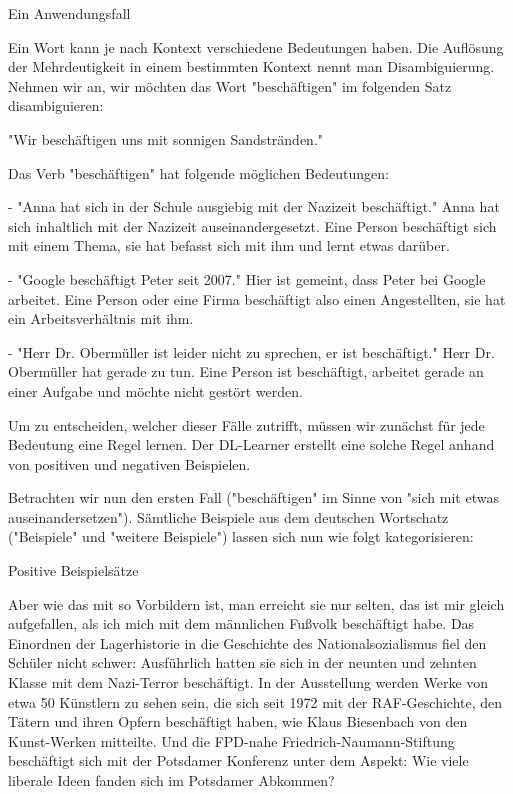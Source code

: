 Ein Anwendungsfall

Ein Wort kann je nach Kontext verschiedene Bedeutungen haben. Die Auflösung der Mehrdeutigkeit in einem bestimmten Kontext nennt man Disambiguierung.
Nehmen wir an, wir möchten das Wort "beschäftigen" im folgenden Satz disambiguieren:

"Wir beschäftigen uns mit sonnigen Sandstränden."

Das Verb "beschäftigen" hat folgende möglichen Bedeutungen:

- "Anna hat sich in der Schule ausgiebig mit der Nazizeit beschäftigt."
Anna hat sich inhaltlich mit der Nazizeit auseinandergesetzt. Eine Person beschäftigt sich mit einem Thema, sie hat befasst sich mit ihm und lernt etwas darüber.

- "Google beschäftigt Peter seit 2007."
Hier ist gemeint, dass Peter bei Google arbeitet. Eine Person oder eine Firma beschäftigt also einen Angestellten, sie hat ein Arbeitsverhältnis mit ihm.

- "Herr Dr. Obermüller ist leider nicht zu sprechen, er ist beschäftigt."
Herr Dr. Obermüller hat gerade zu tun. Eine Person ist beschäftigt, arbeitet gerade an einer Aufgabe und möchte nicht gestört werden.

Um zu entscheiden, welcher dieser Fälle zutrifft, müssen wir zunächst für jede Bedeutung eine Regel lernen.
Der DL-Learner erstellt eine solche Regel anhand von positiven und negativen Beispielen.

Betrachten wir nun den ersten Fall ("beschäftigen" im Sinne von "sich mit etwas auseinandersetzen").
Sämtliche Beispiele aus dem deutschen Wortschatz ("Beispiele" und "weitere Beispiele") lassen sich nun wie folgt kategorisieren:

Positive Beispielsätze

Aber wie das mit so Vorbildern ist, man erreicht sie nur selten, das ist mir gleich aufgefallen, als ich mich mit dem männlichen Fußvolk beschäftigt habe.
Das Einordnen der Lagerhistorie in die Geschichte des Nationalsozialismus fiel den Schüler nicht schwer: Ausführlich hatten sie sich in der neunten und zehnten Klasse mit dem Nazi-Terror beschäftigt.
In der Ausstellung werden Werke von etwa 50 Künstlern zu sehen sein, die sich seit 1972 mit der RAF-Geschichte, den Tätern und ihren Opfern beschäftigt haben, wie Klaus Biesenbach von den Kunst-Werken mitteilte.
Und die FPD-nahe Friedrich-Naumann-Stiftung beschäftigt sich mit der Potsdamer Konferenz unter dem Aspekt: Wie viele liberale Ideen fanden sich im Potsdamer Abkommen?

